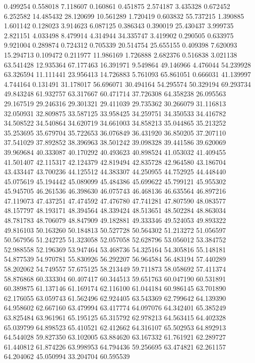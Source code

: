 0.499254
0.558018
7.118607
0.160861
0.451875
2.574187
3.435328
0.672452
6.252582
14.485432
28.120699
10.561289
1.720419
0.603832
55.737215
1.390885
1.601142
0.128023
3.914623
6.087125
0.386343
0.390019
25.430437
3.999735
2.821151
4.033498
8.479914
4.314944
34.335747
3.419902
0.290505
0.633975
9.921004
0.289874
0.724312
0.705339
20.514754
25.655155
0.409398
7.620093
15.294713
0.109472
0.211977
11.986169
1.726888
2.682376
0.516838
3.021138
63.541428
12.935364
67.177463
16.391971
9.549864
49.146966
4.476044
54.239928
63.326594
11.111441
23.956413
14.726883
5.761093
65.861051
0.666031
41.139997
4.744164
0.131491
31.178017
56.696071
30.494164
54.295574
50.329194
69.293734
49.843248
61.932757
63.317667
60.471714
37.726308
64.358238
26.095563
29.167519
29.246316
29.301321
29.411039
29.735362
30.266079
31.116813
32.050931
32.809875
33.587125
33.958425
34.259751
34.350533
34.416782
34.508522
34.540864
34.620719
34.661003
34.858213
35.044865
35.213252
35.253695
35.679704
35.722653
36.076849
36.431920
36.850205
37.207110
37.541029
37.892852
38.396963
38.501242
39.098328
39.441586
39.620069
39.969684
40.333087
40.170292
40.493623
40.898524
41.053032
41.409455
41.501407
42.115317
42.124379
42.819494
42.835728
42.964580
43.186704
43.433447
43.700236
44.125512
44.383307
44.250955
44.752925
44.448440
45.075619
45.194442
45.089099
45.484386
45.699622
45.799121
45.955302
45.945705
46.261536
46.398630
46.075743
46.468136
46.635564
46.897216
47.119073
47.437251
47.474592
47.476780
47.741281
47.807590
48.083577
48.157797
48.193171
48.394564
48.339424
48.513651
48.502284
48.863034
48.781783
48.706079
48.847909
49.182881
49.333346
49.524053
49.893322
49.816103
50.163260
50.184813
50.527728
50.564302
51.213272
51.056597
50.567956
51.242725
51.323058
52.057058
52.628796
53.056012
53.384752
52.988558
52.196369
53.947464
53.468736
54.325164
54.305816
55.148181
54.877539
54.970781
55.830926
56.292207
56.964584
56.483194
57.440289
58.202062
54.749557
57.675125
58.213449
59.711873
58.058692
57.411374
58.876868
60.333304
60.407417
60.344513
59.651763
60.047190
60.531891
60.389875
61.137146
61.169174
62.116100
61.044184
60.986145
63.701890
62.176055
63.059743
61.562496
62.924405
63.543369
62.799642
64.139390
64.958602
62.667160
63.479994
63.417774
64.097076
64.342401
65.385249
63.825484
63.961961
65.195125
65.315792
62.978213
64.563415
64.402328
65.039799
64.898523
65.410521
62.412662
64.316107
65.502953
64.892913
64.544028
59.827350
63.102005
63.884620
63.167332
61.761921
62.289727
61.440812
61.874226
63.998953
64.794436
59.256695
63.474821
62.261157
64.204062
45.050994
33.204704
60.595539

